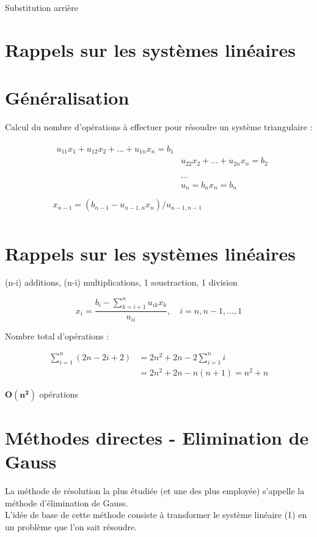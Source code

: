 \documentclass[10pt]{article}
\begin{document}
Substitution arrière

\section*{Rappels sur les systèmes linéaires}
\section*{Généralisation}
Calcul du nombre d'opérations à effectuer pour résoudre un système triangulaire :

\[
\begin{array}{ll} 
& \begin{array}{ll}
u_{11} x_{1}+u_{12} x_{2}+\ldots+u_{1 n} x_{n}=b_{1} \\
& u_{22} x_{2}+\ldots+u_{2 n} x_{n}=b_{2} \\
& \\
& \\
& \ldots \\
& u_{n}=b_{n} x_{n}=b_{n}
\end{array} \\
& \\
& x_{n-1}=\left(b_{n-1}-u_{n-1, n} x_{n}\right) / u_{n-1, n-1} \\
&
\end{array}
\]

\section*{Rappels sur les systèmes linéaires}
(n-i) additions, (n-i) multiplications, 1 soustraction, 1 division

\[
x_{i}=\frac{b_{i}-\sum_{k=i+1}^{n} u_{i k} x_{k}}{u_{i i}}, \quad i=n, n-1, \ldots, 1
\]

Nombre total d'opérations :

\[
\begin{aligned}
\sum_{i=1}^{n}(2 n-2 i+2) & =2 n^{2}+2 n-2 \sum_{i=1}^{n} i \\
& =2 n^{2}+2 n-n(n+1)=n^{2}+n
\end{aligned}
\]

\(\boldsymbol{O}\left(\boldsymbol{n}^{\mathbf{2}}\right)\) opérations

\section*{Méthodes directes - Elimination de Gauss}
La méthode de résolution la plus étudiée (et une des plus employée) s'appelle la méthode d'élimination de Gauss.\\
L'idée de base de cette méthode consiste à transformer le système linéaire (1) en un problème que l'on sait résoudre.
\end{document}
